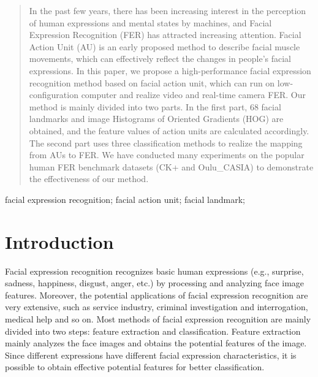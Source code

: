 \documentclass[10pt, conference, compsocconf]{IEEEtran}
\begin{document}




\maketitle


\begin{abstract}
In the past few years, there has been increasing interest in the perception of human expressions and mental states by machines, and Facial Expression Recognition (FER) has attracted increasing attention. Facial Action Unit (AU) is an early proposed method to describe facial muscle movements, which can effectively reflect the changes in people's facial expressions. In this paper, we propose a high-performance facial expression recognition method based on facial action unit, which can run on low-configuration computer and realize video and real-time camera FER. Our method is mainly divided into two parts. In the first part, 68 facial landmarks and image Histograms of Oriented Gradients (HOG) are obtained, and the feature values of action units are calculated accordingly. The second part uses three classification methods to realize the mapping from AUs to FER. We have conducted many experiments on the popular human FER benchmark datasets (CK+ and Oulu\_CASIA) to demonstrate the effectiveness of our method.
\end{abstract}

\begin{IEEEkeywords}
facial expression recognition; facial action unit; facial landmark;

\end{IEEEkeywords}


%
\IEEEpeerreviewmaketitle



\section{Introduction}
Facial expression recognition recognizes basic human expressions\cite{Peter2009Computation} (e.g., surprise, sadness, happiness, disgust, anger, etc.) by processing and analyzing face image features. Moreover, the potential applications of facial expression recognition are very extensive, such as service industry, criminal investigation and interrogation, medical help\cite{Girard2013Social} and so on. Most methods of facial expression recognition are mainly divided into two steps: feature extraction and classification. Feature extraction mainly analyzes the face images and obtains the potential features of the image. Since different expressions have different facial expression characteristics, it is possible to obtain effective potential features for better classification.
\end{document}
